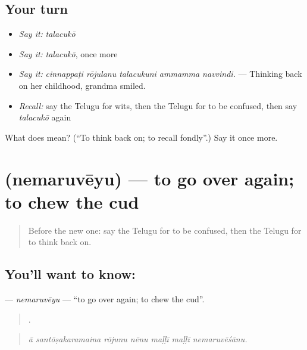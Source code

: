 \subsection*{Your turn}
\begin{itemize}
\raggedright
  \item \emph{Say it:} \emph{talacukō}
  \item \emph{Say it:} \emph{talacukō}, once more
  \item \emph{Say it:} \emph{cinnappaṭi rōjulanu talacukuni ammamma navvindi.} — Thinking back on her childhood, grandma smiled.
  \item \emph{Recall:} say the Telugu for wits, then the Telugu for to be confused, then say \emph{talacukō} again
\end{itemize}

\begin{tcolorbox}[breakable,colback=teal!4,colframe=teal!35!black,title={Before you move on}]
What does  mean? (\textquotedblleft{}To think back on; to recall fondly\textquotedblright{}.) Say it once more.
\end{tcolorbox}
\section[\texorpdfstring{\te{నెమరువేయు} (nemaruvēyu)}{నెమరువేయు (nemaruvēyu)}]{ (nemaruvēyu) — to go over again; to chew the cud}

\label{lesson:TE-C511-nemaruveyu}



\begin{quote}
Before the new one: say the Telugu for to be confused, then the Telugu for to think back on.
\end{quote}

\subsection*{You'll want to know: }
\textbf{} — \emph{nemaruvēyu} — \textquotedblleft{}to go over again; to chew the cud\textquotedblright{}.

\begin{quote}
      .
\end{quote}

\begin{quote}
\emph{ā santōṣakaramaina rōjunu nēnu maḷḷī maḷḷī nemaruvēśānu.}
\end{quote}

